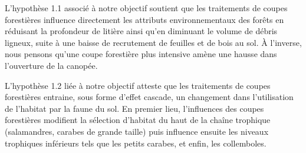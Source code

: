 L'hypothèse 1.1 associé à notre objectif soutient que les traitements de coupes forestières influence directement les attributs environnementaux des forêts en 
réduisant la profondeur de litière ainsi qu'en diminuant le volume de débris ligneux, suite à une baisse de recrutement de feuilles et de bois au sol. 
À l'inverse, nous pensons qu'une coupe forestière plus intensive amène une hausse dans l'ouverture de la canopée.

L'hypothèse 1.2 liée à notre objectif atteste que les traitements de coupes forestières entraine, sous forme d'effet cascade, un changement dans l'utilisation de l'habitat par la faune du sol. 
En premier lieu, l'influences des coupes forestières modifient la sélection d'habitat du haut de la chaîne trophique (salamandres, carabes de grande taille)
puis influence ensuite les niveaux trophiques inférieurs tels que les petits carabes, 
et enfin, les collemboles.

\cleardoublepage



